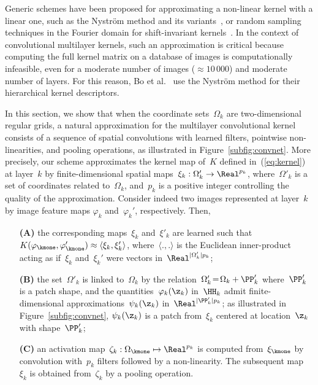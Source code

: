 Generic schemes have been proposed for approximating a non-linear kernel with a
linear one, such as the Nystr\"om method and its
variants~\cite{bo2009,williams2001}, or random sampling techniques in the
Fourier domain for shift-invariant kernels~\cite{rahimi2007}.  In the context
of convolutional multilayer kernels, such an approximation is critical because
computing the full kernel matrix on a database of images is computationally
infeasible, even for a moderate number of images ($\approx 10\,000$) and
moderate number of layers. For this reason, Bo et al.~\cite{bo2011}
use the Nystr\"om method for their hierarchical kernel descriptors. 

In this section, we show that when the coordinate sets~$\Omega_k$ are 
two-dimensional regular grids, a natural approximation for the multilayer convolutional kernel consists of a sequence of
spatial convolutions with learned filters, pointwise non-linearities, and pooling
operations, as illustrated in Figure~\ref{subfig:convnet}. 
More precisely, our scheme approximates the kernel map of~$K$ defined
in~(\ref{eq:kernel}) at layer~$k$ by finite-dimensional spatial maps~$\xi_k: \Omega'_k \to \Real^{p_k}$, where~$\Omega'_k$ is a set of coordinates related to~$\Omega_k$,
and~$p_k$ is a positive integer controlling the quality of the approximation. 
Consider indeed two images represented at layer~$k$ by image
feature maps $\varphi_k$ and~$\varphi_k'$, respectively. Then,
\begin{itemize}[leftmargin=0.7cm]
   \item[{\bfseries (A)}] the corresponding maps~$\xi_k$ and~$\xi'_k$ are learned such that
      $K(\varphi_{\kmone},\varphi_{\kmone}') \approx \langle \xi_k, \xi_k' \rangle$, where~$\langle.,.\rangle$ is
      the Euclidean inner-product acting as if~$\xi_k$ and~$\xi_k'$ were vectors in~$\Real^{|\Omega_k'| p_k}$;
   \item[{\bfseries (B)}] the set~$\Omega'_k$ is linked to~$\Omega_k$ by the
      relation~$\Omega_k'\!=\!\Omega_k + \PP_k'$ where~$\PP_k'$ is a patch
      shape, and the quantities~$\varphi_k(\z_k)$ in~$\HH_k$ admit finite-dimensional 
      approximations~$\psi_k(\z_k)$ in~$\Real^{|\PP_k'|p_k}$; as
      illustrated in Figure~\ref{subfig:convnet}, $\psi_k(\z_k)$ is a patch
      from~$\xi_k$ centered at location~$\z_k$ with shape~$\PP_k'$;
   \item[{\bfseries (C)}] an activation map~$\zeta_{k}: \Omega_{\kmone} \mapsto \Real^{p_{k}}$ is computed from~$\xi_{\kmone}$ by 
      convolution with~$p_k$ filters followed by a non-linearity. The subsequent map~$\xi_k$ is obtained from~$\zeta_k$ by a
      pooling operation. 
\end{itemize}
